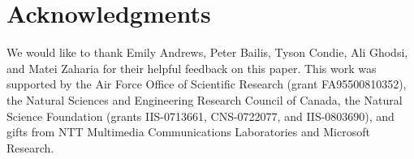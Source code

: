 \section*{Acknowledgments}
We would like to thank Emily Andrews, Peter Bailis, Tyson Condie, Ali Ghodsi,
and Matei Zaharia for their helpful feedback on this paper.  This work was
supported by the Air Force Office of Scientific Research (grant FA95500810352),
the Natural Sciences and Engineering Research Council of Canada, the Natural
Science Foundation (grants IIS-0713661, CNS-0722077, and IIS-0803690), and gifts
from NTT Multimedia Communications Laboratories and Microsoft Research.
